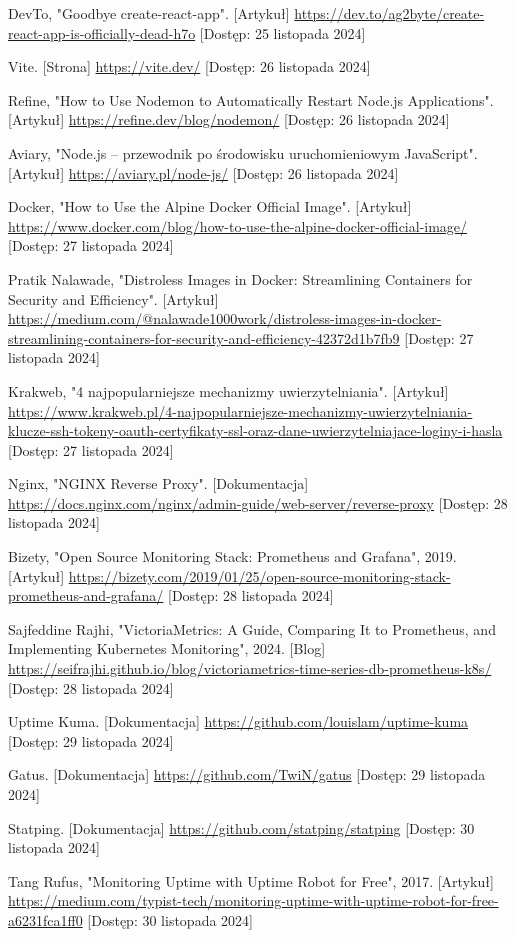 \documentclass{article}
\begin{document}
\begin{thebibliography}{9}
DevTo, "Goodbye create-react-app". [Artykuł] \url{https://dev.to/ag2byte/create-react-app-is-officially-dead-h7o} [Dostęp: 25 listopada 2024]

Vite. [Strona] \url{https://vite.dev/} [Dostęp: 26 listopada 2024]

Refine, "How to Use Nodemon to Automatically Restart Node.js Applications". [Artykuł] \url{https://refine.dev/blog/nodemon/} [Dostęp: 26 listopada 2024]

Aviary, "Node.js – przewodnik po środowisku uruchomieniowym JavaScript". [Artykuł] \url{https://aviary.pl/node-js/} [Dostęp: 26 listopada 2024]

Docker, "How to Use the Alpine Docker Official Image". [Artykuł] \url{https://www.docker.com/blog/how-to-use-the-alpine-docker-official-image/} [Dostęp: 27 listopada 2024]

Pratik Nalawade, "Distroless Images in Docker: Streamlining Containers for Security and Efficiency". [Artykuł] \url{https://medium.com/@nalawade1000work/distroless-images-in-docker-streamlining-containers-for-security-and-efficiency-42372d1b7fb9} [Dostęp: 27 listopada 2024]

Krakweb, "4 najpopularniejsze mechanizmy uwierzytelniania". [Artykuł] \url{https://www.krakweb.pl/4-najpopularniejsze-mechanizmy-uwierzytelniania-klucze-ssh-tokeny-oauth-certyfikaty-ssl-oraz-dane-uwierzytelniajace-loginy-i-hasla} [Dostęp: 27 listopada 2024]

Nginx, "NGINX Reverse Proxy". [Dokumentacja] \url{https://docs.nginx.com/nginx/admin-guide/web-server/reverse-proxy} [Dostęp: 28 listopada 2024]

Bizety, "Open Source Monitoring Stack: Prometheus and Grafana", 2019. [Artykuł] \url{https://bizety.com/2019/01/25/open-source-monitoring-stack-prometheus-and-grafana/} [Dostęp: 28 listopada 2024]

Sajfeddine Rajhi, "VictoriaMetrics: A Guide, Comparing It to Prometheus, and Implementing Kubernetes Monitoring", 2024. [Blog] \url{https://seifrajhi.github.io/blog/victoriametrics-time-series-db-prometheus-k8s/} [Dostęp: 28 listopada 2024]


Uptime Kuma. [Dokumentacja] \url{https://github.com/louislam/uptime-kuma} [Dostęp: 29 listopada 2024]


Gatus. [Dokumentacja] \url{https://github.com/TwiN/gatus} [Dostęp: 29 listopada 2024]


Statping. [Dokumentacja] \url{https://github.com/statping/statping} [Dostęp: 30 listopada 2024]

Tang Rufus, "Monitoring Uptime with Uptime Robot for Free", 2017. [Artykuł] \url{https://medium.com/typist-tech/monitoring-uptime-with-uptime-robot-for-free-a6231fca1ff0} [Dostęp: 30 listopada 2024]



\end{thebibliography}
\end{document}
